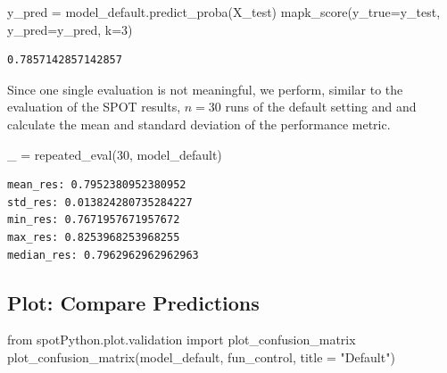 \documentclass[
  letterpaper,
  DIV=11,
  numbers=noendperiod]{scrreprt}
\newenvironment{Shaded}{\begin{snugshade}}{\end{snugshade}}
\newcommand{\DecValTok}[1]{\textcolor[rgb]{0.68,0.00,0.00}{#1}}
\newcommand{\ImportTok}[1]{\textcolor[rgb]{0.00,0.46,0.62}{#1}}
\newcommand{\NormalTok}[1]{\textcolor[rgb]{0.00,0.23,0.31}{#1}}
\newcommand{\OperatorTok}[1]{\textcolor[rgb]{0.37,0.37,0.37}{#1}}
\newcommand{\StringTok}[1]{\textcolor[rgb]{0.13,0.47,0.30}{#1}}
\begin{document}
\begin{Shaded}
\begin{Highlighting}[]
\NormalTok{y\_pred }\OperatorTok{=}\NormalTok{ model\_default.predict\_proba(X\_test)}
\NormalTok{mapk\_score(y\_true}\OperatorTok{=}\NormalTok{y\_test, y\_pred}\OperatorTok{=}\NormalTok{y\_pred, k}\OperatorTok{=}\DecValTok{3}\NormalTok{)}
\end{Highlighting}
\end{Shaded}

\begin{verbatim}
0.7857142857142857
\end{verbatim}

Since one single evaluation is not meaningful, we perform, similar to
the evaluation of the SPOT results, \(n=30\) runs of the default setting
and and calculate the mean and standard deviation of the performance
metric.

\begin{Shaded}
\begin{Highlighting}[]
\NormalTok{\_ }\OperatorTok{=}\NormalTok{ repeated\_eval(}\DecValTok{30}\NormalTok{, model\_default)}
\end{Highlighting}
\end{Shaded}

\begin{verbatim}
mean_res: 0.7952380952380952
std_res: 0.013824280735284227
min_res: 0.7671957671957672
max_res: 0.8253968253968255
median_res: 0.7962962962962963
\end{verbatim}

\hypertarget{plot-compare-predictions-2}{%
\subsection{Plot: Compare
Predictions}\label{plot-compare-predictions-2}}

\begin{Shaded}
\begin{Highlighting}[]
\ImportTok{from}\NormalTok{ spotPython.plot.validation }\ImportTok{import}\NormalTok{ plot\_confusion\_matrix}
\NormalTok{plot\_confusion\_matrix(model\_default, fun\_control, title }\OperatorTok{=} \StringTok{"Default"}\NormalTok{)}
\end{Highlighting}
\end{Shaded}
\end{document}
